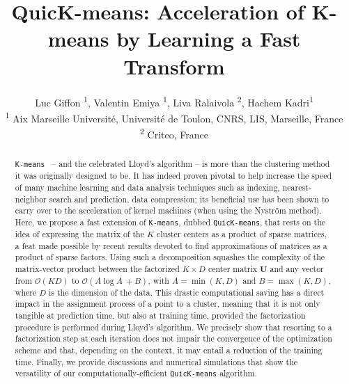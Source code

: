 \documentclass[letterpaper]{article} %
\title{QuicK-means: Acceleration of K-means by Learning a Fast Transform}
\author{}
\author{%
  Luc Giffon  \textsuperscript{\rm 1},
Valentin Emiya \textsuperscript{\rm 1},
Liva Ralaivola \textsuperscript{\rm 2},
Hachem Kadri\textsuperscript{\rm 1} \\
\textsuperscript{\rm 1} Aix Marseille Université, Université de Toulon, CNRS, LIS, Marseille, France \\
\textsuperscript{\rm 2} Criteo, France
}
\def\datadim{D}
\def\nclusters{K}
\def\kmeans{\texttt{K-means}\xspace}
\begin{document}
\maketitle

\begin{abstract}
\kmeans~ -- and the celebrated Lloyd's algorithm -- is more than the clustering method it was originally designed to be. 
It has indeed proven pivotal to help increase the speed of many machine learning and data analysis techniques such as indexing, nearest-neighbor search and prediction, data compression; its beneficial use has been shown to carry over to the acceleration of kernel machines (when using the Nyström method). 
Here, we propose a fast extension of \kmeans, dubbed \texttt{QuicK-means}, that rests on the idea of expressing the matrix of the $\nclusters$ cluster centers as a product of sparse matrices, a feat made possible by recent results devoted to find approximations of matrices as a product of sparse factors.
Using such a decomposition squashes the complexity of the matrix-vector product between the factorized $\nclusters \times \datadim$ center matrix $\mathbf{U}$ and any vector from $\mathcal{O}(\nclusters \datadim)$ to $\mathcal{O}(A \log A~ +B)$, with $A=\min (\nclusters,\datadim)$ and $B=\max (\nclusters,\datadim)$, where $\datadim$ is the dimension of the data. 
This drastic computational saving has a direct impact in the assignment process of a point to a cluster, meaning that it is not only tangible at prediction time, but also at training time, provided the factorization procedure is performed during Lloyd's algorithm. 
We precisely show that resorting to a factorization step at each iteration does not impair the convergence of the optimization scheme and that, depending on the context, it may entail a reduction of the training time. Finally, we provide discussions and numerical simulations that show the versatility of our computationally-efficient  \texttt{QuicK-means} algorithm. 
\end{abstract}









\cleardoublepage
\onecolumn 
\appendix
\renewcommand\appendixpagename{Supplemental material}
\appendixpage

\end{document}
